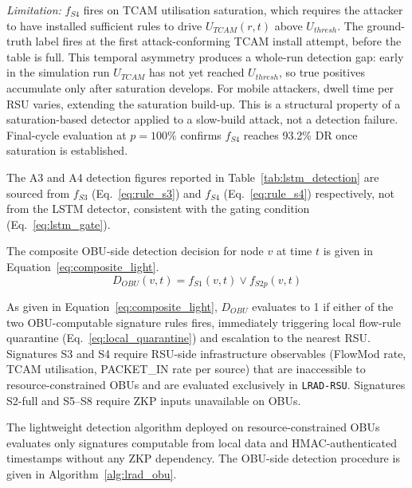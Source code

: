 \documentclass[12pt, a4paper]{report}
\begin{document}
\textit{Limitation:}
$f_{S4}$ fires on \ac{TCAM} utilisation saturation,
which requires the attacker to have installed
sufficient rules to drive $U_{TCAM}(r,t)$ above
$U_{thresh}$. The ground-truth label fires at the
first attack-conforming \ac{TCAM} install attempt,
before the table is full. This temporal asymmetry
produces a whole-run detection gap: early in the
simulation run $U_{TCAM}$ has not yet reached
$U_{thresh}$, so true positives accumulate only
after saturation develops. For mobile attackers,
dwell time per \ac{RSU} varies, extending the
saturation build-up. This is a structural property
of a saturation-based detector applied to a
slow-build attack, not a detection failure. Final-cycle
evaluation at $p=100\%$ confirms $f_{S4}$ reaches
93.2\% \ac{DR} once saturation is established.

The A3 and A4 detection figures reported in
Table~\ref{tab:lstm_detection} are sourced from
$f_{S3}$ (Eq.~\ref{eq:rule_s3}) and $f_{S4}$
(Eq.~\ref{eq:rule_s4}) respectively, not from the
\ac{LSTM} detector, consistent with the gating
condition (Eq.~\ref{eq:lstm_gate}).

The composite \ac{OBU}-side detection decision for
node $v$ at time $t$ is given in
Equation~\eqref{eq:composite_light}.
\begin{equation}
D_{OBU}(v,t) = f_{S1}(v,t) \lor f_{S2p}(v,t)
\label{eq:composite_light}
\end{equation}

As given in Equation~\eqref{eq:composite_light},
$D_{OBU}$ evaluates to 1 if either of the two
\ac{OBU}-computable signature rules fires,
immediately triggering local flow-rule quarantine
(Eq.~\ref{eq:local_quarantine}) and escalation to
the nearest \ac{RSU}. Signatures S3 and S4 require
\ac{RSU}-side infrastructure observables (FlowMod
rate, TCAM utilisation, PACKET\_IN rate per source)
that are inaccessible to resource-constrained \ac{OBU}s
and are evaluated exclusively in \texttt{LRAD-RSU}.
Signatures S2-full and S5--S8 require \ac{ZKP}
inputs unavailable on \ac{OBU}s.


The lightweight detection algorithm deployed on
resource-constrained \ac{OBU}s evaluates only signatures
computable from local data and \ac{HMAC}-authenticated
timestamps without any \ac{ZKP} dependency.
The \ac{OBU}-side detection procedure is given in
Algorithm~\ref{alg:lrad_obu}.
\end{document}
